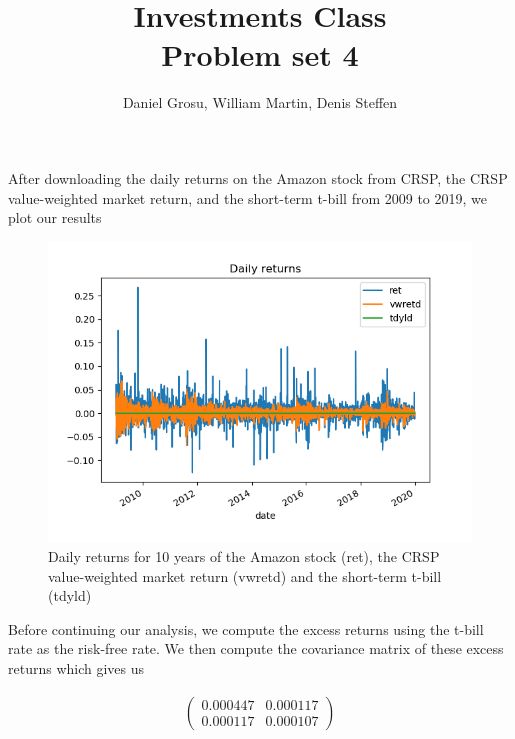 \documentclass[10pt]{article}
\newenvironment{exercise}[2][Exercise]{\begin{trivlist}
  \item[\hskip \labelsep {\bfseries #1}\hskip \labelsep {\bfseries #2.}]}{\end{trivlist}}
\begin{document}
	
  \renewcommand{\qedsymbol}{\smiley}
	\title{Investments Class \\ Problem set 4}
	\author{Daniel Grosu, William Martin, Denis Steffen}
	
	\maketitle

  \begin{exercise}{1}
   
\end{exercise}

\newpage

\begin{exercise}{2}

	After downloading the daily returns on the Amazon stock from CRSP, the CRSP value-weighted market return, and the short-term t-bill from 2009 to 2019, we plot our results
	
	\begin{figure}[H]
	
		\centering
		\includegraphics[scale=0.8]{figures/ex2_1.png}	
		\caption{Daily returns for 10 years of the Amazon stock (ret), the CRSP value-weighted  market return (vwretd) and the short-term t-bill (tdyld)}	
		\label{fig:ex2_1}	
	
	\end{figure} 
	
 	Before continuing our analysis, we compute the excess returns using the t-bill rate as the risk-free rate. We then compute the covariance matrix of these excess returns which gives us
	
	\begin{align*}
		\begin{pmatrix}
			0.000447 & 0.000117\\
			0.000117 & 0.000107
		\end{pmatrix}			
	\end{align*}	 
	

\end{exercise}
\end{document}
